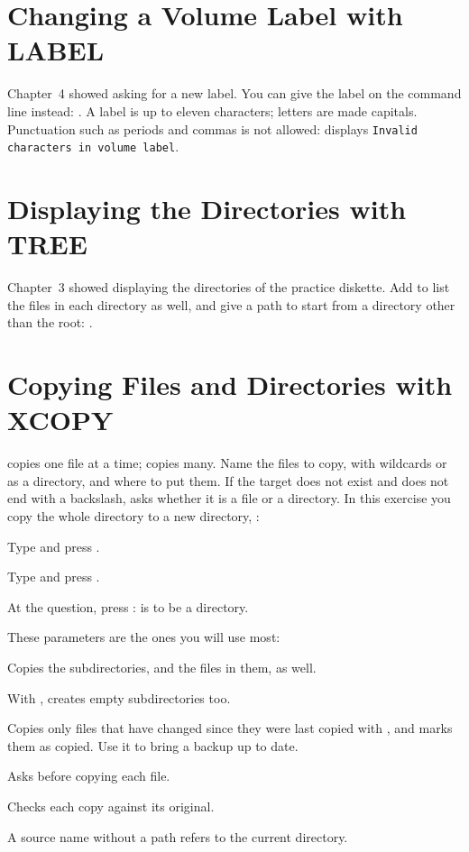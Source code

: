 \section{Changing a Volume Label with LABEL}
Chapter~4 showed  asking for a new label.  You can give the label
on the command line instead: .  A label is up to eleven
characters; letters are made capitals.  Punctuation such as periods and
commas is not allowed:  displays \texttt{Invalid characters in
volume label}.

\section{Displaying the Directories with TREE}
Chapter~3 showed  displaying the directories of the practice
diskette.  Add  to list the files in each directory as well, and give
a path to start from a directory other than the root:
.

\section{Copying Files and Directories with XCOPY}
 copies one file at a time;  copies many.  Name the
files to copy, with wildcards or as a directory, and where to put them.  If
the target does not exist and does not end with a backslash, 
asks whether it is a file or a directory.  In this exercise you copy the
whole directory  to a new directory, :
\begin{Steps}
\item Type  and press .
\item Type  and press .
\item At the question, press :  is to be a directory.
\end{Steps}


These parameters are the ones you will use most:

Copies the subdirectories, and the files in them, as well.

With , creates empty subdirectories too.

Copies only files that have changed since they were last copied
with , and marks them as copied.  Use it to bring a backup up to
date.

Asks before copying each file.

Checks each copy against its original.

A source name without a path refers to the current directory.
